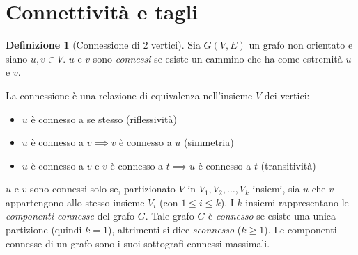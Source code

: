\documentclass[a4paper, oneside, openany]{book}
\theoremstyle{plain}
\theoremstyle{definition}
\newtheorem{defn}{Definizione}[chapter]
\begin{document}
\section{Connettività e tagli}
\begin{defn}[Connessione di 2 vertici] Sia $G(V,E)$ un grafo non orientato 
e siano $u,v \in V$. $u$ e $v$ sono \emph{connessi} se esiste 
un cammino che ha come estremità $u$ e $v$.
\end{defn}
La connessione è una relazione di equivalenza nell'insieme $V$ dei vertici:
\begin{itemize}
    \item{$u$ è connesso a se stesso (riflessività)}
    \item{$u$ è connesso a $v \implies v$ è connesso a $u$ (simmetria)}
    \item{$u$ è connesso a $v$ e $v$ è connesso a $t \implies u$ è connesso a $t$ (transitività)}
\end{itemize}
$u$ e $v$ sono connessi solo se, partizionato $V$ in $V_1, V_2, \dots, V_k$ insiemi, sia $u$
che $v$ appartengono allo stesso insieme $V_i$ (con $1 \leqslant i \leqslant k$).
I $k$ insiemi rappresentano le \emph{componenti connesse} del grafo $G$. Tale grafo
$G$ è \emph{connesso} se esiste una unica partizione (quindi $k = 1$), altrimenti si dice
\emph{sconnesso} ($k \geqslant 1$). Le componenti connesse di un grafo sono i suoi sottografi
connessi massimali.
\end{document}
